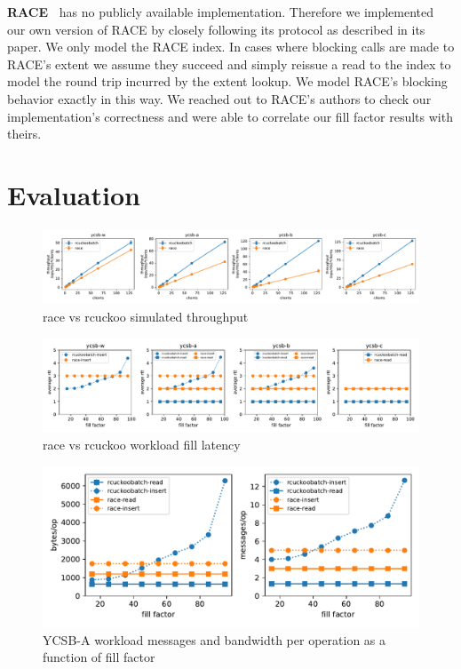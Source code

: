 \textbf{RACE~\cite{race}} has no publicly available
implementation. Therefore we implemented our own version of
RACE by closely following its protocol as described in its
paper.  We only model the RACE index. In cases where
blocking calls are made to RACE's extent we assume they
succeed and simply reissue a read to the index to model the
round trip incurred by the extent lookup. We model RACE's
blocking behavior exactly in this way. We reached out to
RACE's authors to check our implementation's correctness and
were able to correlate our fill factor results with theirs.

\section{Evaluation}
\label{sec:eval}

\begin{figure}[ht]
    \includegraphics[width=0.99\linewidth]{fig/hero_ycsb_throughput.pdf}
    \caption{race vs rcuckoo simulated throughput }
    \label{fig:ycsb_throughput}
\end{figure}

\begin{figure}[ht]
    \includegraphics[width=0.99\linewidth]{fig/hero_ycsb_fill_latency.pdf}
    \caption{race vs rcuckoo workload fill latency}
    \label{fig:ycsb_fill_latency}
\end{figure}

\begin{figure}[ht]
    \includegraphics[width=0.99\linewidth]{fig/hero_ycsb_fill_ops_bw.pdf}
    \caption{YCSB-A workload messages and bandwidth per operation as a function of fill factor}
    \label{fig:ycsb_fill_ops_bw}
\end{figure}

